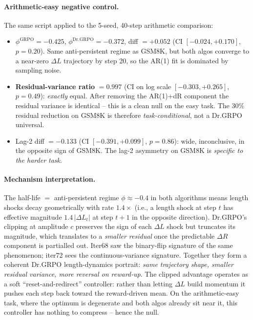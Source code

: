 \paragraph{Arithmetic-easy negative control.}
The same script applied to the 5-seed, 40-step arithmetic comparison:
\begin{itemize}
\item $\phi^{\mathrm{GRPO}} = -0.425$, $\phi^{\mathrm{Dr.GRPO}} = -0.372$,
      diff $= +0.052$ (CI $[-0.024, +0.170]$, $p = 0.20$). Same
      anti-persistent regime as GSM8K, but both algos converge to a
      near-zero $\Delta L$ trajectory by step 20, so the AR(1) fit is
      dominated by sampling noise.
\item \textbf{Residual-variance ratio} $= 0.997$ (CI on log scale
      $[-0.303, +0.265]$, $p = 0.49$): \emph{exactly} equal. After
      removing the AR(1)+dR component the residual variance is
      identical -- this is a clean null on the easy task. The 30\%
      residual reduction on GSM8K is therefore \emph{task-conditional},
      not a Dr.GRPO universal.
\item Lag-2 diff $= -0.133$ (CI $[-0.391, +0.099]$, $p = 0.86$): wide,
      inconclusive, in the opposite sign of GSM8K. The lag-2
      asymmetry on GSM8K is \emph{specific to the harder task}.
\end{itemize}

\paragraph{Mechanism interpretation.}
The half-life $=$ anti-persistent regime $\phi \approx -0.4$ in both
algorithms means length shocks decay geometrically with rate
$1.4 \times$ (i.e., a length shock at step $t$ has effective magnitude
$1.4\,|\Delta L_t|$ at step $t+1$ in the opposite direction).
Dr.GRPO's clipping at amplitude $c$ preserves the sign of each
$\Delta L$ shock but truncates its magnitude, which translates to a
\emph{smaller residual} once the predictable $\Delta R$ component is
partialled out. Iter68 saw the binary-flip signature of the same
phenomenon; iter72 sees the continuous-variance signature.
Together they form a coherent Dr.GRPO length-dynamics portrait:
\emph{same trajectory shape, smaller residual variance, more reversal
on reward-up}. The clipped advantage operates as a soft
``reset-and-redirect'' controller: rather than letting $\Delta L$ build
momentum it pushes each step back toward the reward-driven mean. On
the arithmetic-easy task, where the optimum is degenerate and both
algos already sit near it, this controller has nothing to compress --
hence the null.

